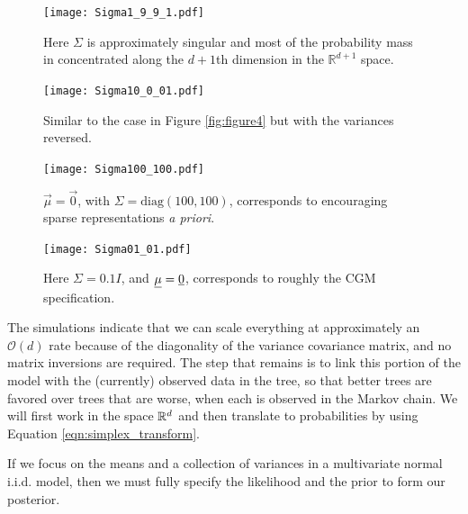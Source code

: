 \begin{figure}[ht]
\begin{minipage}[b]{0.45\linewidth}
\centering
\texttt{[image: Sigma1\_9\_9\_1.pdf]}
\caption[ALN plot $\Sigma$ numerically singular]{Here $\Sigma$ is approximately singular and most of the probability mass in concentrated along the $d+1$th dimension in the $\mathbb{R}^{d+1}$ space.  }
\label{fig:figure5}
\end{minipage}
\hspace{0.5cm}
\begin{minipage}[b]{0.45\linewidth}
\centering
\texttt{[image: Sigma10\_0\_01.pdf]}
\caption[Similar to the case in Figure \ref{fig:figure4} but with the variances reversed]{Similar to the case in Figure \ref{fig:figure4} but with the variances reversed.}
\label{fig:figure6}
\end{minipage}
\end{figure}

 \begin{figure}[ht]
\begin{minipage}[b]{0.45\linewidth}
\centering
\texttt{[image: Sigma100\_100.pdf]}
\caption[ALN plot with a zero vector mean and $\Sigma=\text{Diag}(100,100)$]{$\vec{\mu}=\vec{0}$, with
 $\Sigma= \text{diag}(100, 100)$, corresponds to encouraging sparse representations \emph{a priori}.  }
\label{fig:figure7}
\end{minipage}
\hspace{0.5cm}
\begin{minipage}[b]{0.45\linewidth}
\centering
\texttt{[image: Sigma01\_01.pdf]}
\caption[ALN plot approximating the CGM model]{Here $\Sigma=0.1I$, and $\underline{\mu}=\underline{{0}}$, corresponds to roughly the CGM specification.}
\label{fig:figure8}
\end{minipage}
\end{figure}

 The simulations indicate that we can scale everything at approximately an $\mathcal{O}(d)$ rate because of the diagonality of the variance covariance matrix, and no matrix inversions are required. The step that remains is to link this portion of the model with the (currently) observed data in the tree, so that better trees are favored over trees that are worse, when each is observed in the Markov chain. We will first work in the space $\mathbb{R}^{d}$ and then translate to probabilities by using Equation \ref{eqn:simplex_transform}.  
 
 If we focus on the means and a collection of variances in a multivariate normal i.i.d. model, then we must fully specify the likelihood and the prior to form our posterior. 
 
